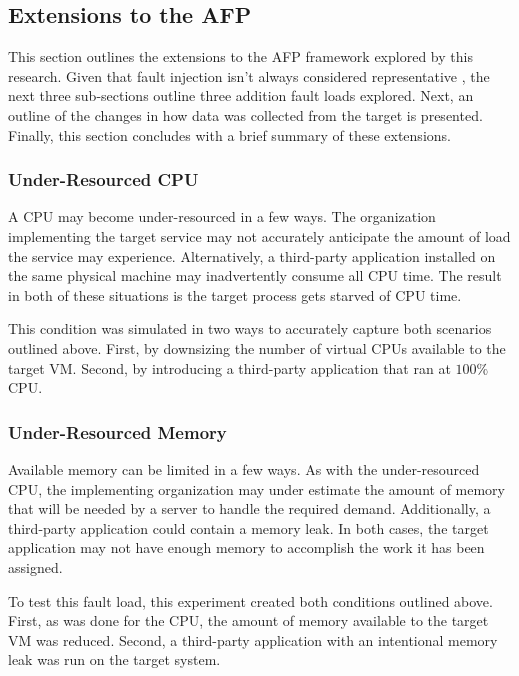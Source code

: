 \setcounter{secnumdepth}{3}

\subsection{Extensions to the \ac{AFP}} \label{sec:extensions}
This section outlines the extensions to the \ac{AFP} framework explored by this
research.  Given that fault injection isn't always considered representative
\citep{kikuchi2014}, the next three sub-sections outline three addition fault
loads explored.  Next, an outline of the changes in how data was collected from
the target is presented.  Finally, this section concludes with a brief summary
of these extensions.

\subsubsection{Under-Resourced \ac{CPU}} \label{sec:extUnderResourcedCPU}
A \ac{CPU} may become under-resourced in a few ways.  The organization
implementing the target service may not accurately anticipate the amount of
load the service may experience.  Alternatively, a third-party application
installed on the same physical machine may inadvertently consume all \ac{CPU}
time.  The result in both of these situations is the target process gets
starved of \ac{CPU} time.

This condition was simulated in two ways to accurately capture both scenarios
outlined above.  First, by downsizing the number of virtual \ac{CPU}s available
to the target \ac{VM}.  Second, by introducing a third-party application that
ran at $100\%$ \ac{CPU}.

\subsubsection{Under-Resourced Memory} \label{sec:extUnderResourcedMem}
Available memory can be limited in a few ways.  As with the under-resourced
\ac{CPU}, the implementing organization may under estimate the amount of memory
that will be needed by a server to handle the required demand.  Additionally, a
third-party application could contain a memory leak.  In both cases, the target
application may not have enough memory to accomplish the work it has been
assigned.

To test this fault load, this experiment created both conditions outlined
above. First, as was done for the \ac{CPU}, the amount of memory available to
the target \ac{VM} was reduced.  Second, a third-party application with an
intentional memory leak was run on the target system.

